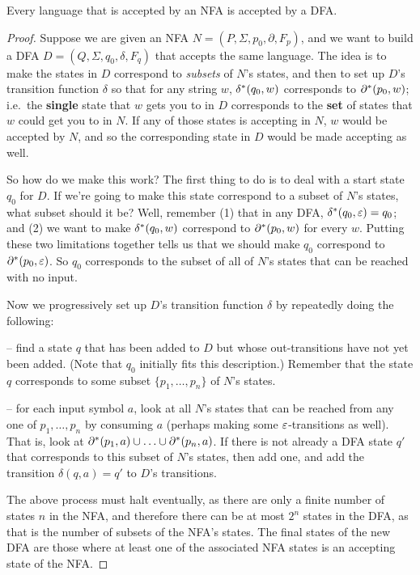 \begin{theorem}
Every language that is accepted by an NFA is accepted by a DFA.
\end{theorem}
\begin{proof} Suppose we are given an NFA $N = (P, \Sigma, p_0, \partial, F_p)$, and we want to
build a DFA $D=(Q, \Sigma, q_0, \delta, F_q)$ that accepts the same language.
The idea is to make the states in $D$ correspond to {\em subsets}
of $N$'s states, and
then to set up $D$'s transition function $\delta$ so that for any string $w$, 
$\delta^*(q_0, w)$ corresponds to $\partial^*(p_0,w)$; i.e.\ the {\bf single} state that
$w$ gets you to in $D$ corresponds to the {\bf set} of states that $w$ could get
you to in $N$.  
If any of those states is accepting in $N$, $w$ would
be accepted by $N$, and so the corresponding state in $D$ would be made accepting
as well.

So how do we make this work?  The first thing to do is to deal with a start state
$q_0$ for $D$.  If we're going to make this state correspond to a subset of $N$'s
states, what subset should it be?  Well, remember (1) that in any DFA,
$\delta^*(q_0, \varepsilon) = q_0$; and (2) we want to make $\delta^*(q_0, w)$ correspond
to $\partial^*(p_0,w)$ for every $w$.  Putting these two limitations together tells
us that we should make $q_0$ correspond to $\partial^*(p_0, \varepsilon)$.  So $q_0$
corresponds to the subset of all of $N$'s states that can be reached with no
input.

Now we progressively set up $D$'s transition function $\delta$ by repeatedly
doing the following:

-- find a state $q$ that has been added to $D$ but whose out-transitions have not
yet been added.  (Note that $q_0$ initially fits this description.)  Remember
that the state $q$ corresponds to some subset $\{p_1, \ldots , p_n\}$ of $N$'s
states.

-- for each input symbol $a$, look at all $N$'s states that can be reached from
any one of $p_1, \ldots , p_n$ by consuming $a$ (perhaps making some
$\varepsilon$-transitions as well).  That is, look at $\partial^*(p_1,a) \cup \ldots \cup
\partial^*(p_n,a)$.  If there is not already a DFA state $q'$ that corresponds to
this subset of $N$'s states, then add one, and add the transition 
$\delta(q, a)= q'$ to $D$'s transitions.

The above process must halt eventually, as there are only a finite
number of states $n$ in the NFA, and therefore there can be at most $2^n$ states in the
DFA, as that is the number of subsets of the NFA's states.  The final states of
the new DFA are those where at least one of the associated NFA states is an
accepting state of the NFA.  


\end{proof}
